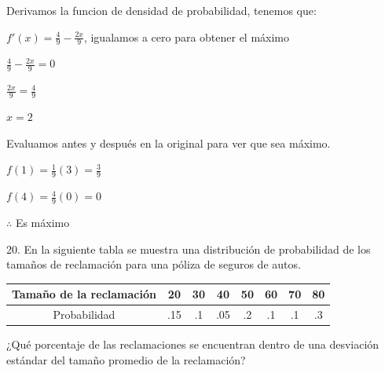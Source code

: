 \documentclass{article}
\begin{document}
        \vspace{.1cm}

        Derivamos la funcion de densidad de probabilidad, tenemos que:\vspace{.1cm}

        $f'(x) = \frac{4}{9} - \frac{2x}{9}$, igualamos a cero para obtener el máximo\vspace{.1cm}

        $\frac{4}{9} - \frac{2x}{9} = 0$\vspace{.1cm}

        $\frac{2x}{9} = \frac{4}{9}$\vspace{.1cm}

        $x = 2$\vspace{.1cm}

        Evaluamos antes y después en la original para ver que sea máximo. \vspace{.1cm}

        $f(1) = \frac{1}{9}(3) = \frac{3}{9}$\vspace{.1cm}

        $f(4) = \frac{4}{9}(0) = 0$\vspace{.1cm}

        $\therefore$ Es máximo

        20. En la siguiente tabla se muestra una distribución de 
        probabilidad de los tamaños de reclamación para una 
        póliza de seguros de autos. \vspace{.1cm}
        
        \begin{center}
            \begin{tabular}{| c | c | c | c | c | c | c | c |}
                \hline
                Tamaño de la reclamación & 20 & 30 & 40 & 50 & 60 & 70 & 80\\ \hline
                Probabilidad & .15 & .1 & .05 & .2 & .1 & .1 & .3\\ \hline
            \end{tabular} \vspace{.1cm}    
        \end{center}

        ¿Qué porcentaje de las reclamaciones se encuentran dentro 
        de una desviación estándar del tamaño promedio de la 
        reclamación?\vspace{.1cm}

        \vspace{.1cm}
\end{document}
